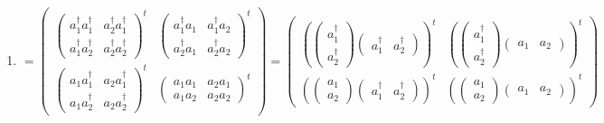 \documentclass[aps,preprint]{revtex4}
\begin{document}
\begin{enumerate}
\item 
\begin{equation}
=\left( 
\begin{array}{cc}
\left( 
\begin{array}{cc}
a_{1}^{\dagger }a_{1}^{\dagger } & a_{2}^{\dagger }a_{1}^{\dagger } \\ 
a_{1}^{\dagger }a_{2}^{\dagger } & a_{2}^{\dagger }a_{2}^{\dagger }%
\end{array}%
\right) ^{t} & \left( 
\begin{array}{cc}
a_{1}^{\dagger }a_{1} & a_{1}^{\dagger }a_{2} \\ 
a_{2}^{\dagger }a_{1} & a_{2}^{\dagger }a_{2}%
\end{array}%
\right) ^{t} \\ 
\left( 
\begin{array}{cc}
a_{1}a_{1}^{\dagger } & a_{2}a_{1}^{\dagger } \\ 
a_{1}a_{2}^{\dagger } & a_{2}a_{2}^{\dagger }%
\end{array}%
\right) ^{t} & \left( 
\begin{array}{cc}
a_{1}a_{1} & a_{2}a_{1} \\ 
a_{1}a_{2} & a_{2}a_{2}%
\end{array}%
\right) ^{t}%
\end{array}%
\right) =\left( 
\begin{array}{cc}
\left( \left( 
\begin{array}{c}
a_{1}^{\dagger } \\ 
a_{2}^{\dagger }%
\end{array}%
\right) \left( 
\begin{array}{cc}
a_{1}^{\dagger } & a_{2}^{\dagger }%
\end{array}%
\right) \right) ^{t} & \left( \left( 
\begin{array}{c}
a_{1}^{\dagger } \\ 
a_{2}^{\dagger }%
\end{array}%
\right) \left( 
\begin{array}{cc}
a_{1} & a_{2}%
\end{array}%
\right) \right) ^{t} \\ 
\left( \left( 
\begin{array}{c}
a_{1} \\ 
a_{2}%
\end{array}%
\right) \left( 
\begin{array}{cc}
a_{1}^{\dagger } & a_{2}^{\dagger }%
\end{array}%
\right) \right) ^{t} & \left( \left( 
\begin{array}{c}
a_{1} \\ 
a_{2}%
\end{array}%
\right) \left( 
\begin{array}{cc}
a_{1} & a_{2}%
\end{array}%
\right) \right) ^{t}%
\end{array}%
\right)
\end{equation}


\end{enumerate}
\end{document}
